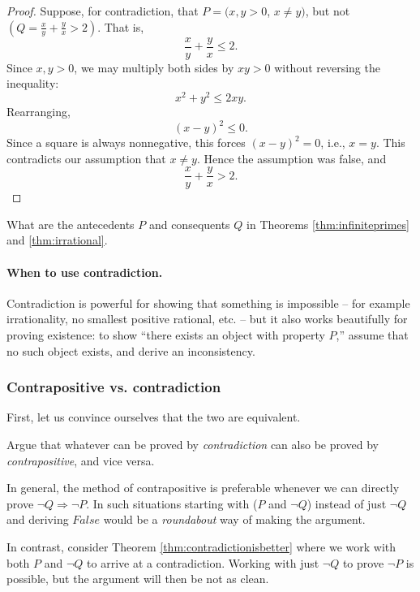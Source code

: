 \begin{proof}
Suppose, for contradiction, that $P = (x, y > 0$, $x \neq y)$, but not $(Q = \frac{x}{y} + \frac{y}{x} > 2)$. That is,
\[
\frac{x}{y} + \frac{y}{x} \leq 2.
\]
Since $x, y > 0$, we may multiply both sides by $xy > 0$ without reversing the inequality:
\[
x^2 + y^2 \leq 2xy.
\]
Rearranging,
\[
(x - y)^2 \leq 0.
\]
Since a square is always nonnegative, this forces $(x-y)^2 = 0$, i.e., $x = y$. This contradicts our assumption that $x \neq y$. Hence the assumption was false, and
\[
\frac{x}{y} + \frac{y}{x} > 2.
\]
\end{proof}

\begin{exercise}
What are the antecedents $P$ and consequents $Q$ in Theorems \ref{thm:infiniteprimes} and \ref{thm:irrational}.
\end{exercise}

\paragraph{When to use contradiction.}
Contradiction is powerful for showing that something is impossible -- for example irrationality, no smallest positive rational, etc. -- but it also works beautifully for proving existence: to show ``there exists an object with property $P$,'' assume that no such object exists, and derive an inconsistency. 

\subsubsection{Contrapositive vs. contradiction}

First, let us convince ourselves that the two are equivalent.
\begin{exercise}
Argue that whatever can be proved by {\em contradiction} can also be proved by {\em contrapositive}, and vice versa.
\end{exercise}

In general, the method of contrapositive is preferable whenever we can directly prove \(\neg Q \Rightarrow \neg P\). In such situations starting with ($P$ and $\neg Q$) instead of just $\neg Q$ and deriving $False$ would be a \emph{roundabout} way of making the argument.

In contrast, consider Theorem \ref{thm:contradictionisbetter} where we work with both $P$ and $\neg Q$ to arrive at a contradiction. Working with just $\neg Q$ to prove $\neg P$ is possible, but the argument will then be not as clean.

